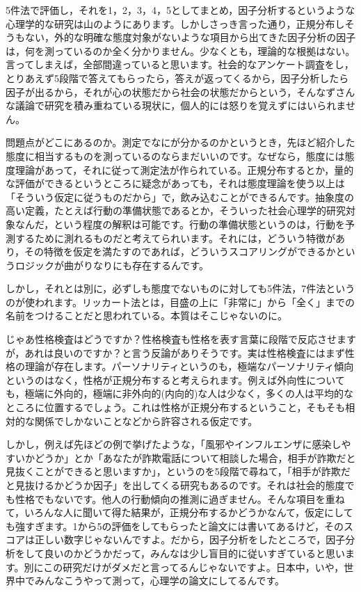 \documentclass{ltjsbook}
\begin{document}
5件法で評価し，それを1，2，3，4，5としてまとめ，因子分析するというような心理学的な研究は山のようにあります。しかしさっき言った通り，正規分布しそうもない，外的な明確な態度対象がないような項目から出てきた因子分析の因子は，何を測っているのか全く分かりません。少なくとも，理論的な根拠はない。言ってしまえば，全部間違っていると思います。社会的なアンケート調査をし，とりあえず5段階で答えてもらったら，答えが返ってくるから，因子分析したら因子が出るから，それが心の状態だから社会の状態だからという，そんなずさんな議論で研究を積み重ねている現状に，個人的には怒りを覚えずにはいられません。

問題点がどこにあるのか。測定でなにが分かるのかというとき，先ほど紹介した態度に相当するものを測っているのならまだいいのです。なぜなら，態度には態度理論があって，それに従って測定法が作られている。正規分布するとか，量的な評価ができるというところに疑念があっても，それは態度理論を使う以上は「そういう仮定に従うものだから」で，飲み込むことができるんです。抽象度の高い定義，たとえば行動の準備状態であるとか，そういった社会心理学的研究対象なんだ，という程度の解釈は可能です。行動の準備状態というのは，行動を予測するために測れるものだと考えてられいます。それには，どういう特徴があり，その特徴を仮定を満たすのであれば，どういうスコアリングができるかというロジックが曲がりなりにも存在するんです。

しかし，それとは別に，必ずしも態度でないものに対しても5件法，7件法というのが使われます。リッカート法とは，目盛の上に「非常に」から「全く」までの名前をつけることだと思われている。本質はそこじゃないのに。

じゃあ性格検査はどうですか？性格検査も性格を表す言葉に段階で反応させますが，あれは良いのですか？と言う反論がありそうです。実は性格検査にはまず性格の理論が存在します。パーソナリティというのも，極端なパーソナリティ傾向というのはなく，性格が正規分布すると考えられます。例えば外向性についても，極端に外向的，極端に非外向的(内向的)な人は少なく，多くの人は平均的なところに位置するでしょう。これは性格が正規分布するということ，そもそも相対的な関係でしかないことなどから許容される仮定です。

しかし，例えば先ほどの例で挙げたような，「風邪やインフルエンザに感染しやすいかどうか」とか「あなたが詐欺電話について相談した場合，相手が詐欺だと見抜くことができると思いますか」，というのを5段階で尋ねて，「相手が詐欺だと見抜けるかどうか因子」を出してくる研究もあるのです\parencite{20219220024}。それは社会的態度でも性格でもないです。他人の行動傾向の推測に過ぎません。そんな項目を重ねて，いろんな人に聞いて得た結果が，正規分布するかどうかなんて，仮定にしても強すぎます。1から5の評価をしてもらったと論文には書いてあるけど，そのスコアは正しい数字じゃないんですよ。だから，因子分析をしたところで，因子分析をして良いのかどうかだって，みんなは少し盲目的に従いすぎていると思います。別にこの研究だけがダメだと言ってるんじゃないですよ。日本中，いや，世界中でみんなこうやって測って，心理学の論文にしてるんです。
\end{document}
